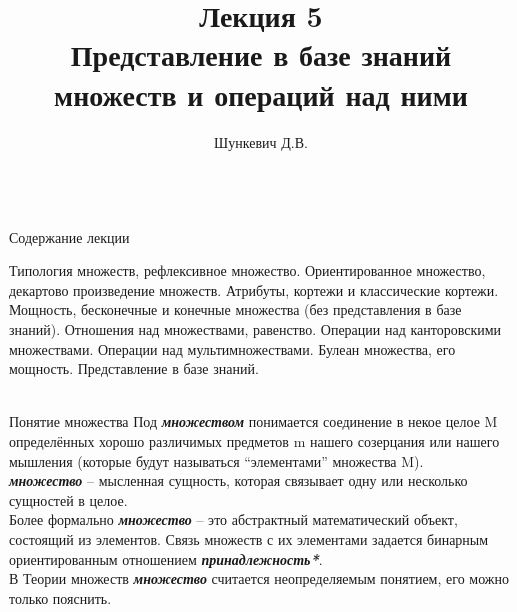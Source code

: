 \title{Лекция 5\\Представление в базе знаний множеств и операций над ними}   
\author[]{Шункевич Д.В.}

\begin{frame}
	\titlepage
\end{frame}

\begin{frame}{\\Содержание лекции}
	
	\topline
	\justifying
	Типология множеств, рефлексивное множество. Ориентированное множество, декартово произведение множеств. Атрибуты, кортежи и классические кортежи. Мощность, бесконечные и конечные множества (без представления в базе знаний). Отношения над множествами, равенство. Операции над канторовскими множествами. Операции над мультимножествами. Булеан множества, его мощность. Представление в базе знаний.
\end{frame}

\begin{frame}{\\Понятие множества}
	\topline
	\justifying
	Под \textbf{\textit{множеством}} понимается соединение в некое целое M определённых хорошо различимых предметов m нашего созерцания или нашего мышления (которые будут называться ``элементами'' множества M).\\
	\bigskip
	\textbf{\textit{множество}} -- мысленная сущность, которая связывает одну или несколько сущностей в целое.\\
	\bigskip
	Более формально \textbf{\textit{множество}} -- это абстрактный математический объект, состоящий из элементов. Связь множеств с их элементами задается бинарным ориентированным отношением \textbf{\textit{принадлежность*}}.\\
	\bigskip
	В Теории множеств \textbf{\textit{множество}} считается неопределяемым понятием, его можно только пояснить.
	\vspace{-3em}
\end{frame}

